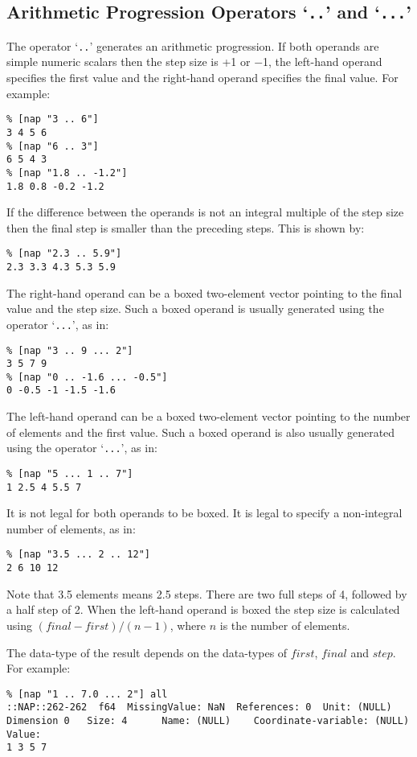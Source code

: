   \subsection{
    \label{AP}Arithmetic Progression Operators `\texttt{..}' and `\texttt{...}'
  }

  \par The operator `\texttt{..}' generates an arithmetic progression. If both
  operands are simple numeric scalars then the step size is +1 or
  $-$1, the left-hand operand specifies the first value and the
  right-hand operand specifies the final value. For example:
  \begin{verbatim}
% [nap "3 .. 6"]
3 4 5 6
% [nap "6 .. 3"]
6 5 4 3
% [nap "1.8 .. -1.2"]
1.8 0.8 -0.2 -1.2
\end{verbatim}

If the difference between the operands is not an integral
multiple of the step size then the final step is smaller than the
preceding steps. This is shown by:
  \begin{verbatim}
% [nap "2.3 .. 5.9"]
2.3 3.3 4.3 5.3 5.9
\end{verbatim}

  \par The right-hand operand can be a boxed two-element vector pointing
  to the final value and the step size. Such a boxed operand is usually
  generated using the operator `\texttt{...}', as in:
  \begin{verbatim}
% [nap "3 .. 9 ... 2"]
3 5 7 9
% [nap "0 .. -1.6 ... -0.5"]
0 -0.5 -1 -1.5 -1.6
\end{verbatim}

  \par The left-hand operand can be a boxed two-element vector pointing
  to the number of elements and the first value. Such a boxed operand
  is also usually generated using the operator `\texttt{...}', as in:
  \begin{verbatim}
% [nap "5 ... 1 .. 7"]
1 2.5 4 5.5 7
\end{verbatim}

It is not legal for both operands to be boxed. It is legal to
specify a non-integral number of elements, as in:
  \begin{verbatim}
% [nap "3.5 ... 2 .. 12"]
2 6 10 12
\end{verbatim}

Note that 3.5 elements means 2.5 steps. There are two full steps
of 4, followed by a half step of 2. When the left-hand operand is boxed
the step size is calculated using
  $(final-first)/(n-1)$,
where $n$ is the number of elements.
  \par The data-type of the result depends on the data-types of 
  $first$, 
  $final$ and 
  $step$. For example:
  \begin{verbatim}
% [nap "1 .. 7.0 ... 2"] all
::NAP::262-262  f64  MissingValue: NaN  References: 0  Unit: (NULL)
Dimension 0   Size: 4      Name: (NULL)    Coordinate-variable: (NULL)
Value:
1 3 5 7
\end{verbatim}

